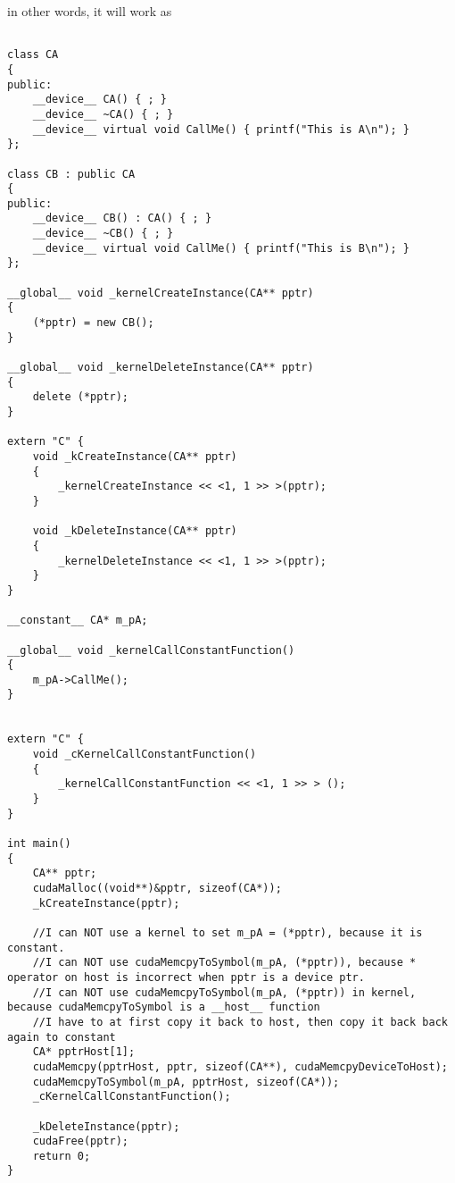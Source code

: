 in other words, it will work as
\begin{lstlisting}

class CA
{
public:
    __device__ CA() { ; }
    __device__ ~CA() { ; }
    __device__ virtual void CallMe() { printf("This is A\n"); }
};

class CB : public CA
{
public:
    __device__ CB() : CA() { ; }
    __device__ ~CB() { ; }
    __device__ virtual void CallMe() { printf("This is B\n"); }
};

__global__ void _kernelCreateInstance(CA** pptr)
{
    (*pptr) = new CB();
}

__global__ void _kernelDeleteInstance(CA** pptr)
{
    delete (*pptr);
}

extern "C" {
    void _kCreateInstance(CA** pptr)
    {
        _kernelCreateInstance << <1, 1 >> >(pptr);
    }

    void _kDeleteInstance(CA** pptr)
    {
        _kernelDeleteInstance << <1, 1 >> >(pptr);
    }
}

__constant__ CA* m_pA;

__global__ void _kernelCallConstantFunction()
{
    m_pA->CallMe();
}


extern "C" {
    void _cKernelCallConstantFunction()
    {
        _kernelCallConstantFunction << <1, 1 >> > ();
    }
}

int main()
{
    CA** pptr;
    cudaMalloc((void**)&pptr, sizeof(CA*));
    _kCreateInstance(pptr);

    //I can NOT use a kernel to set m_pA = (*pptr), because it is constant.
    //I can NOT use cudaMemcpyToSymbol(m_pA, (*pptr)), because * operator on host is incorrect when pptr is a device ptr.
    //I can NOT use cudaMemcpyToSymbol(m_pA, (*pptr)) in kernel, because cudaMemcpyToSymbol is a __host__ function
    //I have to at first copy it back to host, then copy it back back again to constant
    CA* pptrHost[1];
    cudaMemcpy(pptrHost, pptr, sizeof(CA**), cudaMemcpyDeviceToHost);
    cudaMemcpyToSymbol(m_pA, pptrHost, sizeof(CA*));
    _cKernelCallConstantFunction();

    _kDeleteInstance(pptr);
    cudaFree(pptr);
    return 0;
}

\end{lstlisting}
